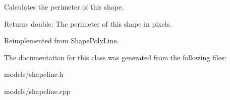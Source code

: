 Calculates the perimeter of this shape. 

\begin{DoxyReturn}{Returns}
double\+: The perimeter of this shape in pixels. 
\end{DoxyReturn}


Reimplemented from \mbox{\hyperlink{class_shape_poly_line_a3d6664ada9c9dd883303a3dcb63d6188}{Shape\+Poly\+Line}}.



The documentation for this class was generated from the following files\+:\begin{DoxyCompactItemize}
\item 
models/shapeline.\+h\item 
models/shapeline.\+cpp\end{DoxyCompactItemize}
